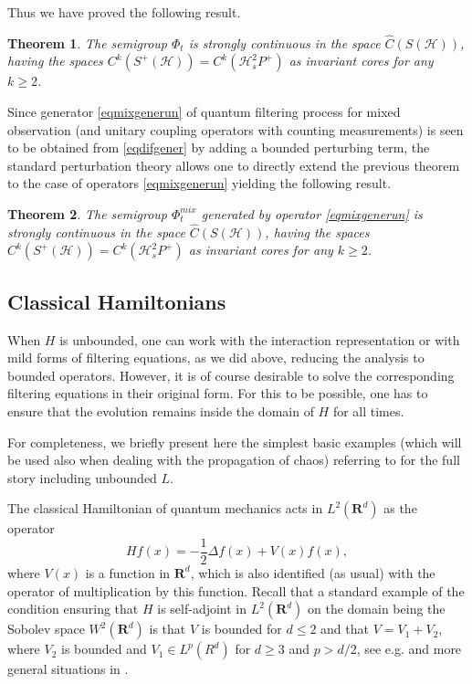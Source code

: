 \documentclass[12pt]{article}
\def\HC{\mathcal{H}}
\def\R{\mathbf{R}}
\newtheorem{theorem}{Theorem}[section]
\newcommand{\De}{\Delta}
\begin{document}
Thus we have proved the following result.

\begin{theorem}
\label{nonLinsdesem}
The semigroup $\Phi_t$ is strongly continuous in the space $\hat C(S(\HC))$, having the spaces
$C^k(S^+(\HC))=C^k(\HC^2_sP^+)$ as invariant cores for any $k\ge 2$.
\end{theorem}

Since generator \eqref{eqmixgenerun} of quantum filtering process for mixed observation (and unitary coupling
operators with counting measurements) is seen to be obtained from \eqref{eqdifgener} by adding a bounded perturbing
term, the standard perturbation theory allows one to directly extend the previous theorem to the case of operators
\eqref{eqmixgenerun}  yielding the following result.

\begin{theorem}
\label{nonLinsdesemmix}
The semigroup $\Phi_t^{mix}$ generated by operator \eqref{eqmixgenerun}
is strongly continuous in the space $\hat C(S(\HC))$, having the spaces
$C^k(S^+(\HC))=C^k(\HC^2_sP^+)$ as invariant cores for any $k\ge 2$.
\end{theorem}

\subsection{Classical Hamiltonians}

When $H$ is unbounded, one can work with the interaction representation
 or with mild forms of filtering equations,
as we did above, reducing the analysis to bounded operators. However, it is of course desirable to solve
the corresponding filtering equations in their original form. For this to be possible, one has to ensure that
the evolution remains inside the domain of $H$ for all times.

For completeness, we briefly present here the simplest basic examples (which will be used
also when dealing with the propagation of chaos) referring to \cite{Kol25b}
for the full story including unbounded $L$.

The classical Hamiltonian of quantum mechanics acts in $L^2(\R^d)$ as the operator
\[
Hf(x)=-\frac12 \De f(x) +V(x) f(x),
\]
where $V(x)$ is a function in $\R^d$, which is also identified (as usual) with the operator
of multiplication by this function.
Recall that a standard example of the condition ensuring that $H$ is self-adjoint
in $L^2(\R^d)$ on the domain being the Sobolev space $W^2(\R^d)$ is that $V$ is bounded
for $d\le 2$ and  that $V=V_1+V_2$,
where $V_2$ is bounded and $V_1\in L^p(R^d)$ for $d\ge 3$ and $p>d/2$, see e.g. \cite{ReedSimon}
and more general situations in \cite{Yajima}.
\end{document}
